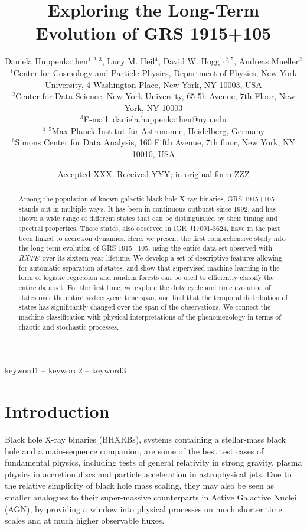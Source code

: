 \documentclass[fleqn,usenatbib]{mnras}
\title[The Long-Term Evolution of GRS 1915+105]{Exploring the Long-Term Evolution of GRS 1915+105}
\author[D. Huppenkothen et al.]{Daniela Huppenkothen$^{1, 2, 3}$, Lucy M. Heil$^{4}$, David W. Hogg$^{1,2,5}$, Andreas Mueller$^{2}$
\\
   $^{1}$Center for Cosmology and Particle Physics, Department of Physics, New York University, 4 Washington Place, New York, NY 10003, USA \\
  $^{2}$Center for Data Science, New York University, 65 5h Avenue, 7th Floor, New York, NY 10003 \\
 $^{3}$E-mail: daniela.huppenkothen@nyu.edu \\
 $^{4}$
  $^{5}$Max-Planck-Institut f\"{u}r Astronomie, Heidelberg, Germany \\
  $^{6}$Simons Center for Data Analysis, 160 Fifth Avenue, 7th floor, New York, NY 10010, USA
}
\date{Accepted XXX. Received YYY; in original form ZZZ}
\newcommand{\project}[1]{\textsl{#1}}
\newcommand{\rxte}{\project{RXTE}}
\begin{document}
\label{firstpage}
\pagerange{\pageref{firstpage}--\pageref{lastpage}}
\maketitle

\begin{abstract}
Among the population of known galactic black hole X-ray binaries, GRS 1915+105 stands out in multiple ways. It has been in continuous outburst since 1992, and has shown a wide range of different states that can be distinguished by their timing and spectral properties. These states, also observed in IGR J17091-3624, have in the past been linked to accretion dynamics. %
Here, we present the first comprehensive study into the long-term evolution of GRS 1915+105, using the entire data set observed with \rxte\ over its sixteen-year lifetime. We develop a set of descriptive features allowing for automatic separation of states, and show that supervised machine learning in the form of logistic regression and random forests can be used to efficiently classify the entire data set. For the first time, we explore the duty cycle and time evolution of states over the entire sixteen-year time span, and find that the temporal distribution of states has significantly changed over the span of the observations. We connect the machine classification with physical interpretations of the phenomenology in terms of chaotic and stochastic processes.
\end{abstract}

\begin{keywords}
keyword1 -- keyword2 -- keyword3
\end{keywords}



\section{Introduction}
Black hole X-ray binaries (BHXRBs), systems containing a stellar-mass black hole and a main-sequence companion, are some of the best test cases of fundamental physics, including tests of general relativity in strong gravity, plasma physics in accretion discs and particle acceleration in astrophysical jets. 
Due to the relative simplicity of black hole mass scaling, they may also be seen as smaller analogues to their super-massive counterparts in Active Galactive Nuclei (AGN), by providing a window into physical processes on much shorter time scales and at much higher observable fluxes.
\end{document}
